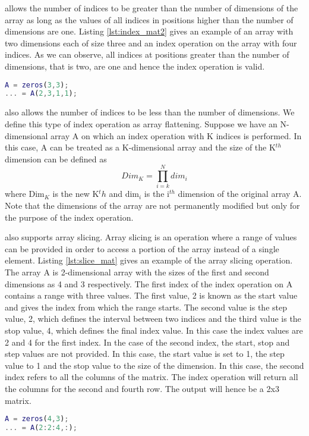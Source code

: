  \matlab allows the number of indices to be greater than the number of dimensions of the array as long as the values of all indices in positions higher than the number of dimensions are one. Listing \ref{lst:index_mat2} gives an example of an array with two dimensions each of size three and an index operation on the array with four indices. As we can observe, all indices at positions greater than the number of dimensions, that is two, are one and hence the index operation is valid.
\begin{lstlisting}[language=matlab, label={lst:index_mat2}, caption={An example of an array index operation where the number of indices are greater than the number of dimensions of the array}]
A = zeros(3,3);
... = A(2,3,1,1);
\end{lstlisting}
\matlab also allows  the number of indices to be less than the number of dimensions. We define this type of index operation as array flattening. Suppose we have an N-dimensional array A on which an index operation with K indices is performed. In this case, A can be treated as a K-dimensional array and the size of the K$^{th}$ dimension can be defined as 
\begin{equation}
Dim_K  = \prod_{i=k}^{N}{dim_i}
\end{equation}
where Dim$_K$ is the new K$^th$ and dim$_i$ is the i$^{th}$ dimension of the original array A. \\
Note that the dimensions of the array are not permanently modified but only for the purpose of the index operation.

\matlab also supports array slicing. Array slicing is an operation where a range of values can be provided in order to access a portion of the array instead of a single element. Listing \ref{lst:slice_mat} gives an example of the array slicing operation. The array A is 2-dimensional array with the sizes of the first and second dimensions as 4 and 3 respectively. The first index of the index operation on A contains a range with three values. The first value, 2 is known as the start value and gives the index from which the range starts. The second value is the step value, 2, which defines the interval between two indices and the third value is the stop value, 4, which defines the final index value. In this case the index values are 2 and 4 for the first index. In the case of the second index, the start, stop and step values are not provided. In this case, the start value is set to 1, the step value to 1 and the stop value to the size of the dimension. In this case, the second index refers to all the columns of the matrix. The index operation will return all the columns for the second and fourth row. The output will hence be a 2x3  matrix.
\begin{lstlisting}[language=matlab, label={lst:slice_mat}, caption={An example of an array slicing operation in \matlab}]
A = zeros(4,3);
... = A(2:2:4,:);
\end{lstlisting}

